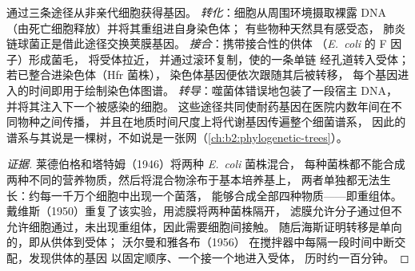 \begin{definition}[水平基因转移]\label{def:b2:genome-diversification:hgt}
通过三条途径从非亲代细胞获得基因。
\emph{转化}：细胞从周围环境摄取裸露 DNA
（由死亡细胞释放）并将其重组进自身染色体；
有些物种天然具有感受态，
肺炎链球菌正是借此途径交换荚膜基因。
\emph{接合}：携带接合性的供体
（\emph{E.~coli} 的 F 因子）形成菌毛，
将受体拉近，
并通过滚环复制，使的一条单链
经孔道转入受体；
若已整合进染色体（Hfr 菌株），
染色体基因便依次跟随其后被转移，
每个基因进入的时间即用于绘制染色体图谱。
\emph{转导}：噬菌体错误地包装了一段宿主 DNA，
并将其注入下一个被感染的细胞。
这些途径共同使耐药基因在医院内数年间在不同物种之间传播，
并且在地质时间尺度上将代谢基因传遍整个细菌谱系，
因此的谱系与其说是一棵树，不如说是一张网（\cref{ch:b2:phylogenetic-trees}）。
\end{definition}
\begin{proof}[证据]
莱德伯格和塔特姆（1946）将两种 \emph{E.~coli} 菌株混合，
每种菌株都不能合成两种不同的营养物质，然后将混合物涂布于基本培养基上，
两者单独都无法生长：约每一千万个细胞中出现一个菌落，
能够合成全部四种物质——即重组体。
戴维斯（1950）重复了该实验，用滤膜将两种菌株隔开，
滤膜允许分子通过但不允许细胞通过，未出现重组体，因此需要细胞间接触。
随后海斯证明转移是单向的，即从供体到受体；
沃尔曼和雅各布（1956）
在搅拌器中每隔一段时间中断交配，发现供体的基因
以固定顺序、一个接一个地进入受体，
历时约一百分钟。
\end{proof}

